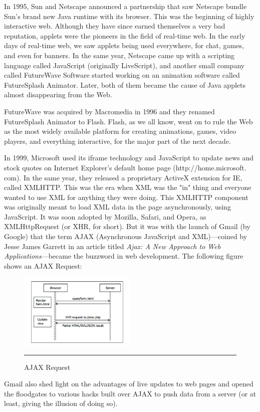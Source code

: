 In 1995, Sun and Netscape announced a partnership that saw Netscape bundle
Sun's brand new Java runtime with its browser. This was the beginning of highly
interactive web. Although they have since earned themselves a very bad reputation,
applets were the pioneers in the field of real-time web. In the early days of real-time
web, we saw applets being used everywhere, for chat, games, and even for banners.
In the same year, Netscape came up with a scripting language called JavaScript
(originally LiveScript), and another small company called FutureWave Software
started working on an animation software called FutureSplash Animator. Later,
both of them became the cause of Java applets almost disappearing from the Web.\cite{15}

FutureWave was acquired by Macromedia in 1996 and they renamed FutureSplash
Animator to Flash. Flash, as we all know, went on to rule the Web as the most widely
available platform for creating animations, games, video players, and everything
interactive, for the major part of the next decade.\cite{15}

In 1999, Microsoft used its iframe technology and JavaScript to update news and
stock quotes on Internet Explorer's default home page (http://home.microsoft.
com). In the same year, they released a proprietary ActiveX extension for IE, called
XMLHTTP. This was the era when XML was the "in" thing and everyone wanted to
use XML for anything they were doing. This XMLHTTP component was originally
meant to load XML data in the page asynchronously, using JavaScript. It was soon
adopted by Mozilla, Safari, and Opera, as XMLHttpRequest (or XHR, for short).
But it was with the launch of Gmail (by Google) that the term AJAX (Asynchronous
JavaScript and XML)—coined by Jesse James Garrett in an article titled \textit{Ajax: A
New Approach to Web Applications}—became the buzzword in web development. The
following figure shows an AJAX Request:
\begin{figure}[h!]
  \centering
    \includegraphics[width=0.5\textwidth]{./Pictures/ajax.jpg}
  \rule{0.5\textwidth}{1pt}
  \caption{AJAX Request}
\end{figure}
Gmail also shed light on the advantages of live updates to web pages and opened the
floodgates to various hacks built over AJAX to push data from a server (or at least,
giving the illusion of doing so).\cite{15}

